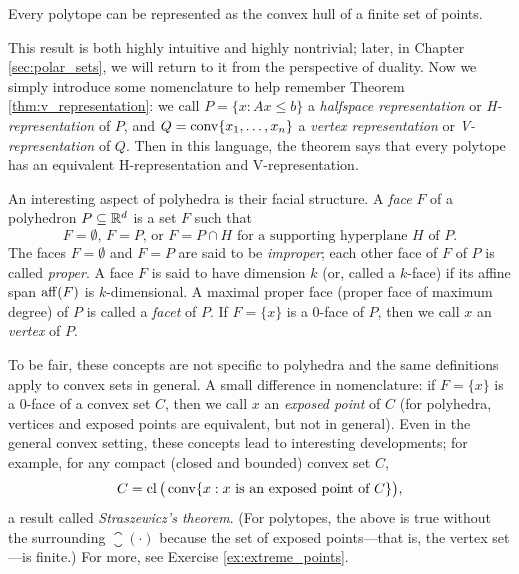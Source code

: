 \begin{Theorem}
\label{thm:v_representation}
Every polytope can be represented as the convex hull of a finite set of points. 
\end{Theorem}


This result is both highly intuitive and highly nontrivial; later, in Chapter
\ref{sec:polar_sets}, we will return to it from the perspective of duality. Now
we simply introduce some nomenclature to help remember Theorem
\ref{thm:v_representation}: we call $P = \{x : Ax \leq b\}$ a \emph{halfspace
  representation} or \emph{H-representation} of $P$, and $Q =
\operatorname{conv}\{x_1,\ldots,x_n\}$ a \emph{vertex representation} or
\emph{V-representation} of $Q$. Then in this language, the theorem  
says that every polytope has an equivalent H-representation and
V-representation.   

An interesting aspect of polyhedra is their facial structure. A \emph{face} $F$
of a polyhedron $P \subseteq \mathbb{R}^d$ is a set $F$ such that 
\[
\text{$F = \emptyset$, $F = P$, or $F = P \cap H$ for a supporting hyperplane
  $H$ of $P$}. 
\]
The faces $F=\emptyset$ and $F=P$ are said to be \emph{improper}; each other
face of $F$ of $P$ is called \emph{proper}. A face $F$ is said to have dimension
$k$ (or, called a $k$-face) if its affine span $\operatorname{aff}(F)$ is $k$-dimensional. A
maximal proper face (proper face of maximum degree) of $P$ is called a
\emph{facet} of $P$. If $F=\{x\}$ is a $0$-face of $P$, then we call $x$ an
\emph{vertex} of $P$. 

To be fair, these concepts are not specific to polyhedra and the same
definitions apply to convex sets in general. A small difference in
nomenclature: if $F = \{x\}$ is a $0$-face of a convex set $C$, then we call $x$
an \emph{exposed point} of $C$ (for polyhedra, vertices and exposed points 
are equivalent, but not in general). Even in the general convex setting, these
concepts lead to interesting developments; for example, for any compact (closed
and bounded) convex set $C$, 
\[
C = \operatorname{cl}\big(\operatorname{conv}\{x : \text{$x$ is an exposed point of $C$}\}\big),  
\]
a result called \emph{Straszewicz's theorem}. (For polytopes, the above is true 
without the surrounding $\closure(\cdot)$ because the set of exposed
points---that is, the vertex set---is finite.) For more, see Exercise
\ref{ex:extreme_points}. 

